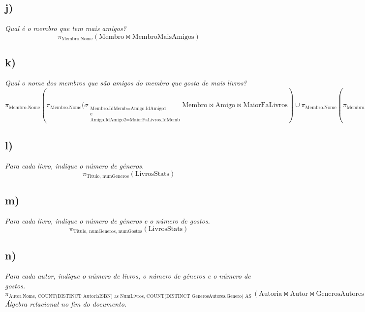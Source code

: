 \documentclass {report}
\begin{document}
\subsection{j)}
\textit{Qual é o membro que tem mais amigos?}
\[
\pi_{\text{Membro.Nome}}\left(\text{Membro} \bowtie \text{MembroMaisAmigos}\right)
\]

\subsection{k)}
\textit{Qual o nome dos membros que são amigos do membro que gosta de mais livros?}
\[
\pi_{\text{Membro.Nome}}\left(\pi_{\text{Membro.Nome}}(\sigma_{\substack{\text{Membro.IdMemb} = \text{Amigo.IdAmigo1} \\ \text{e} \\ \text{Amigo.IdAmigo2} = \text{MaiorFaLivros.IdMemb}}}\text{Membro} \bowtie \text{Amigo} \bowtie \text{MaiorFaLivros} \right) \cup \pi_{\text{Membro.Nome}}\left(\pi_{\text{Membro.Nome}}(\sigma_{\substack{\text{Membro.IdMemb} = \text{Amigo.IdAmigo2} \\ \text{e} \\ \text{Amigo.IdAmigo1} = \text{MaiorFaLivros.IdMemb}}}\text{Membro} \bowtie \text{Amigo} \bowtie \text{MaiorFaLivros} \right)
\]
%

\subsection{l)}
\textit{Para cada livro, indique o número de géneros.}
\[
\pi_{\text{Titulo, numGeneros}}\left(\text{LivrosStats} \right)
\]

\subsection{m)}
\textit{Para cada livro, indique o número de géneros e o número de gostos.}
\[
\pi_{\text{Titulo, numGeneros, numGostos}}\left(\text{LivrosStats} \right)
\]

\subsection{n)}
\textit{Para cada autor, indique o número de livros, o número de géneros e o número de gostos.}
\[
\pi_{\text{Autor.Nome, COUNT(DISTINCT AutoriaISBN) as NumLivros, COUNT(DISTINCT GenerosAutores.Genero) AS NumGeneros, SUM(DISTINCT numGostos) as NumGostos}}\left(\text{Autoria} \bowtie \text{Autor} \bowtie \text{GenerosAutores} \bowtie \text{LivrosStats} \right)
\]
\textit{Álgebra relacional no fim do documento.}
\end{document}
